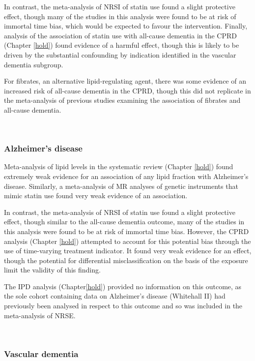 \documentclass[a4paper, twoside]{templates/ociamthesis}
\begin{document}
In contrast, the meta-analysis of NRSI of statin use found a slight protective effect, though many of the studies in this analysis were found to be at risk of immortal time bias, which would be expected to favour the intervention. Finally, analysis of the association of statin use with all-cause dementia in the CPRD (Chapter \ref{hold}) found evidence of a harmful effect, though this is likely to be driven by the substantial confounding by indication identified in the vascular dementia subgroup.

For fibrates, an alternative lipid-regulating agent, there was some evidence of an increased risk of all-cause dementia in the CPRD, though this did not replicate in the meta-analysis of previous studies examining the association of fibrates and all-cause dementia.

~

\hypertarget{alzheimers-disease}{%
\subsubsection{Alzheimer's disease}\label{alzheimers-disease}}

Meta-analysis of lipid levels in the systematic review (Chapter \ref{hold}) found extremely weak evidence for an association of any lipid fraction with Alzheimer's disease. Similarly, a meta-analysis of MR analyses of genetic instruments that mimic statin use found very weak evidence of an association.

In contrast, the meta-analysis of NRSI of statin use found a slight protective effect, though similar to the all-cause dementia outcome, many of the studies in this analysis were found to be at risk of immortal time bias. However, the CPRD analysis (Chapter \ref{hold}) attempted to account for this potential bias through the use of time-varying treatment indicator. It found very weak evidence for an effect, though the potential for differential misclassification on the basis of the exposure limit the validity of this finding.

The IPD analysis (Chapter\ref{hold}) provided no information on this outcome, as the sole cohort containing data on Alzheimer's disease (Whitehall II) had previously been analysed in respect to this outcome and so was included in the meta-analysis of NRSE.

~

\hypertarget{vascular-dementia}{%
\subsubsection{Vascular dementia}\label{vascular-dementia}}
\end{document}
